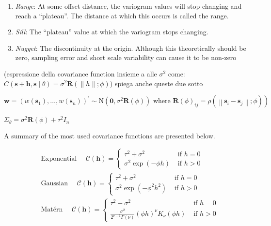 \documentclass[
  12pt,
  a4paper,
  oneside]{book}
\providecommand{\tightlist}{%
  \setlength{\itemsep}{0pt}\setlength{\parskip}{0pt}}
\theoremstyle{definition}
\theoremstyle{definition}
\theoremstyle{definition}
\theoremstyle{remark}
\begin{document}
\begin{enumerate}
\def\labelenumi{\arabic{enumi}.}
\tightlist
\item
  \emph{Range}: At some offset distance, the variogram values will stop changing and reach a ``plateau''. The distance at which this occurs is called the range.
\item
  \emph{Sill}: The ``plateau'' value at which the variogram stops changing.
\item
  \emph{Nugget}: The discontinuity at the origin. Although this theoretically should be zero, sampling error and short scale variability can cause it to be non-zero
\end{enumerate}

(espressione della covariance function insieme a alle \(\sigma^2\) come: \(C(\mathbf{s}+\mathbf{h}, \mathbf{s} \mid \theta)=\sigma^{2} \mathbf{R}(\|h\| ; \phi)\))
spiega anche queste due sotto

\[
\mathbf{w}=\left(w\left(\mathbf{s}_{1}\right), \ldots, w\left(\mathbf{s}_{n}\right)\right)^{\prime} \sim \mathrm{N}\left(\mathbf{0}, \sigma^{2} \mathbf{R}(\phi)\right) \text { where } \left.\mathbf{R}(\phi)_{i j}=\rho\left(\left\|\mathbf{s}_{i}-\mathbf{s}_{j}\right\| ; \phi\right)\right)
\]

\(\Sigma_{\theta}=\sigma^{2} \mathbf{R}(\phi)+\tau^{2} I_{n}\)

A summary of the most used covariance functions are presented below.

\[
\begin{aligned}
&\text { Exponential } \quad \mathcal{C}(\mathbf{h})=\left\{\begin{array}{cl}
\tau^{2}+\sigma^{2} & \text { if }  h=0 \\
\sigma^{2} \exp (-\phi h) & \text { if } h>0 
\end{array}\right.\\
&\text { Gaussian } \quad \mathcal{C}(\mathbf{h})=\left\{\begin{array}{cl}
\tau^{2}+\sigma^{2} & \text { if } h=0 \\
\sigma^{2} \exp \left(-\phi^{2} h^{2}\right) & \text { if } h>0 
\end{array}\right. \\
&\text { Matérn } \quad \mathcal{C}(\mathbf{h})=\left\{\begin{array}{cl}
\tau^{2}+\sigma^{2} & \text { if } h=0 \\
\frac{\sigma^{2}}{2^{\nu-1} \Gamma(\nu)}(\phi h)^{\nu} K_{\nu}(\phi h) & \text { if } h>0
\end{array}\right.
\end{aligned}
\]
\end{document}
